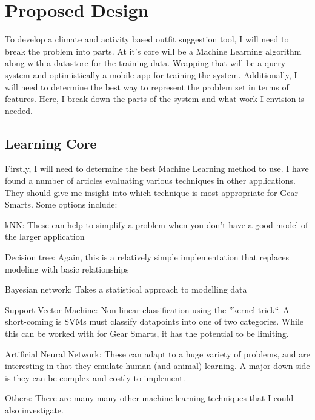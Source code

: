 \section{Proposed Design}
\label{section:propeseddesign}
To develop a climate and activity based outfit suggestion tool, I will need to break the problem into parts.
At it's core will be a Machine Learning algorithm along with a datastore for the training data. Wrapping that will
be a query system and optimistically a mobile app for training the system. Additionally, I will need to determine 
the best way to represent the problem set in terms of features. Here, I break down the parts of the system and what
work I envision is needed.

\subsection{Learning Core}
Firstly, I will need to determine the best Machine Learning method to use. I have found a number of articles evaluating
various techniques in other applications. They should give me insight into which technique is most appropriate for Gear
Smarts. Some options include:

\begin{description}
  \item{kNN:} These can help to simplify a problem when you don't have a good model of the larger application
  \item{Decision tree:} Again, this is a relatively simple implementation that replaces modeling with basic relationships
  \item{Bayesian network:} Takes a statistical approach to modelling data
  \item{Support Vector Machine:} Non-linear classification using the ''kernel trick``. A short-coming is SVMs must classify
  datapoints into one of two categories. While this can be worked with for Gear Smarts, it has the potential to be limiting.
  \item{Artificial Neural Network:} These can adapt to a huge variety of problems, and are interesting in that they emulate
  human (and animal) learning. A major down-side is they can be complex and costly to implement.
  \item{Others:} There are many many other machine learning techniques that I could also investigate.
\end{description}

